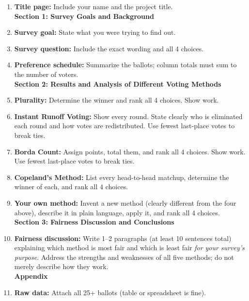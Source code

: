 \documentclass[11pt]{article}
\begin{document}
\begin{enumerate}[leftmargin=*, label=\(\square\)]
\item \textbf{Title page:} Include your name and the project title.\\

\hspace*{-.2in}\textbf{Section 1: Survey Goals and Background}
  \item \textbf{Survey goal:} State what you were trying to find out.
  \item \textbf{Survey question:} Include the exact wording and all 4 choices.
  \item \textbf{Preference schedule:} Summarize the ballots; column totals must sum to the number of voters.\\
  
 \hspace*{-.2in}\textbf{Section 2: Results and Analysis of Different Voting Methods}
  \item \textbf{Plurality:} Determine the winner and rank all 4 choices. Show work.
  \item \textbf{Instant Runoff Voting:} Show every round. State clearly who is eliminated each round and how votes are redistributed. Use fewest last-place votes to break ties.
  \item \textbf{Borda Count:} Assign points, total them, and rank all 4 choices. Show work. Use fewest last-place votes to break ties.
  \item \textbf{Copeland's Method:} List every head-to-head matchup, determine the winner of each, and rank all 4 choices.
  \item \textbf{Your own method:} Invent a new method (clearly different from the four above), describe it in plain language, apply it, and rank all 4 choices.\\
  
  
 \hspace*{-.2in}\textbf{Section 3: Fairness Discussion and Conclusions}
  \item \textbf{Fairness discussion:} Write 1--2 paragraphs (at least 10 sentences total) explaining which method is most fair and which is least fair \emph{for your survey's purpose}. Address the strengths and weaknesses of all five methods; do not merely describe how they work.\\
 
\hspace*{-.2in}\noindent\textbf{Appendix}
   \item \textbf{Raw data:} Attach all 25+ ballots (table or spreadsheet is fine).
\end{enumerate}
\end{document}
